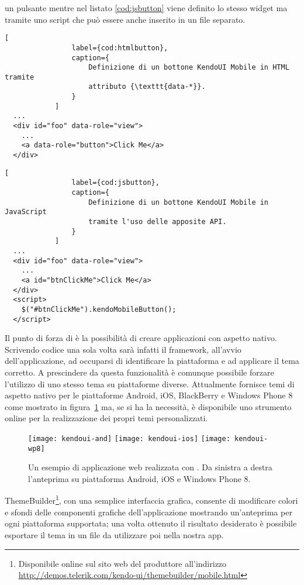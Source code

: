             \html{} un pulsante \kendomob{} mentre nel listato \ref{cod:jsbutton}
            viene definito lo stesso widget ma tramite uno script \js{} che
            può essere anche inserito in un file separato.
            \begin{lstlisting}[
                label={cod:htmlbutton},
                caption={
                    Definizione di un bottone KendoUI Mobile in HTML tramite
                    attributo {\texttt{data-*}}.
                }
            ]
  ...
  <div id="foo" data-role="view">
    ...
    <a data-role="button">Click Me</a>
  </div>
            \end{lstlisting}
            \begin{lstlisting}[
                label={cod:jsbutton},
                caption={
                    Definizione di un bottone KendoUI Mobile in JavaScript
                    tramite l'uso delle apposite API.
                }
            ]
  ...
  <div id="foo" data-role="view">
    ...
    <a id="btnClickMe">Click Me</a>
  </div>
  <script>
    $("#btnClickMe").kendoMobileButton();
  </script>
            \end{lstlisting}

            Il punto di forza di \kendomob{} è la possibilità di creare
            applicazioni con aspetto nativo. Scrivendo codice una sola volta
            sarà infatti il frame\-work, all'avvio dell'applicazione, ad occuparsi
            di identificare la piattaforma e ad applicare il tema corretto. A
            prescindere da questa funzionalità è comunque possibile forzare
            l'utilizzo di uno stesso tema su piattaforme diverse. Attualmente
            \kendomob{} fornisce temi di aspetto nativo per le piattaforme
            Android, iOS, BlackBerry e Windows Phone 8 come mostrato in
            figura~\ref{fig:kendoui} ma, se si ha la necessità, è disponibile
            uno strumento online per la realizzazione dei propri temi
            personalizzati.
            \begin{figure}[h]
                \centering
                \texttt{[image: kendoui-and]}
                \texttt{[image: kendoui-ios]}
                \texttt{[image: kendoui-wp8]}
                \caption{
                    Un esempio di applicazione web realizzata con \kendomob{}.
                    Da sinistra a destra l'anteprima su piattaforma Android, iOS
                    e Windows Phone 8.
                }
                \label{fig:kendoui}
            \end{figure}
            ThemeBuilder\footnote{Disponibile online sul sito web del produttore
            all'indirizzo \url{http://demos.telerik.com/kendo-ui/themebuilder/mobile.html}},
            con una semplice interfaccia grafica, consente di modificare colori e
            sfondi delle componenti grafiche dell'applicazione mostrando
            un'anteprima per ogni piattaforma supportata; una volta ottenuto il
            risultato desiderato è possibile esportare il tema in un file \css{} da
            utilizzare poi nella nostra app.

